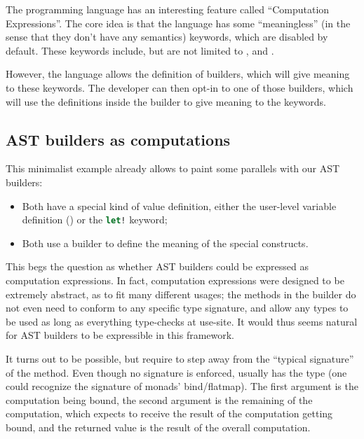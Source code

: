 \label{sec:ce}

The \Fsharp{} programming language has an interesting feature called ``Computation Expressions''.
The core idea is that the language has some ``meaningless'' 
(in the sense that they don't have any semantics) keywords, which are disabled by default.
These keywords include, but are not limited to ,  and .

However, the language allows the definition of builders, which will give meaning to these keywords.
The developer can then opt-in to one of those builders, 
which will use the definitions inside the builder to give meaning to the keywords.


\subsection{AST builders as computations}

This minimalist example already allows to paint some parallels with our AST builders:
\begin{itemize}
    \item Both have a special kind of value definition, either the user-level variable definition (\scalasnippet{!}) or the \lstinline[language=fsharp]{let!} keyword;
    \item Both use a builder to define the meaning of the special constructs.
\end{itemize}

This begs the question as whether AST builders could be expressed as computation expressions.
In fact, computation expressions were designed to be extremely abstract,
as to fit many different usages; the methods in the builder do not even need to conform to any specific type signature, and allow any types to be used as long as everything type-checks at use-site.
It would thus seems natural for AST builders to be expressible in this framework.

It turns out to be possible, but require to step away from the ``typical signature'' of the  method. Even though no signature is enforced,  usually has the type  (one could recognize the signature of monads' bind/flatmap). The first argument is the computation being bound, the second argument is the remaining of the computation, which expects to receive the result of the computation getting bound, and the returned value is the result of the overall computation.

